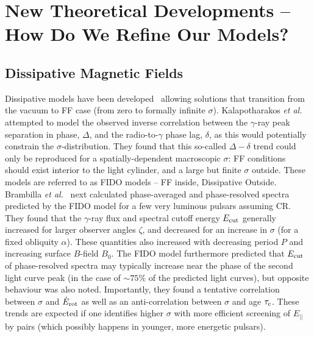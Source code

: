 \documentclass{PoS}
\begin{document}
\section{New Theoretical Developments -- How Do We Refine Our Models?}\label{sec:Theory}
\subsection{Dissipative Magnetic Fields}
Dissipative models have been developed~\cite{Kalapotharakos12, Kalapotharakos14,Li12} allowing solutions that transition from the vacuum to FF case (from zero to formally infinite $\sigma$). Kalapotharakos \textit{et al.}~\cite{Kalapotharakos14} attempted to model the observed inverse correlation between the $\gamma$-ray peak separation in phase, $\Delta$, and the radio-to-$\gamma$ phase lag, $\delta$, as this would potentially constrain the $\sigma$-distribution. They found that this so-called $\Delta-\delta$ trend could only be reproduced for a spatially-dependent macroscopic $\sigma$: FF conditions should exist interior to the light cylinder, and a large but finite $\sigma$ outside. These models are referred to as FIDO models -- FF inside, Dissipative Outside. Brambilla \textit{et al.}~\cite{Brambilla15} next calculated phase-averaged and phase-resolved spectra predicted by the FIDO model for a few very luminous pulsars assuming CR. They found that the $\gamma$-ray flux and spectral cutoff energy $E_{\rm cut}$ generally increased for larger observer angles $\zeta$, and decreased for an increase in $\sigma$ (for a fixed obliquity $\alpha$). These quantities also increased with decreasing period $P$ and increasing surface $B$-field $B_0$. The FIDO model furthermore predicted that $E_{\rm cut}$ of phase-resolved spectra may typically increase near the phase of the second light curve peak (in the case of $\sim75\%$ of the predicted light curves), but opposite behaviour was also noted. Importantly, they found a tentative correlation between $\sigma$ and $\dot{E}_{\rm rot}$ as well as an anti-correlation between $\sigma$ and age $\tau_{\rm c}$. These trends are expected if one identifies higher $\sigma$ with more efficient screening of $E_{||}$ by pairs (which possibly happens in younger, more energetic pulsars).
\end{document}
